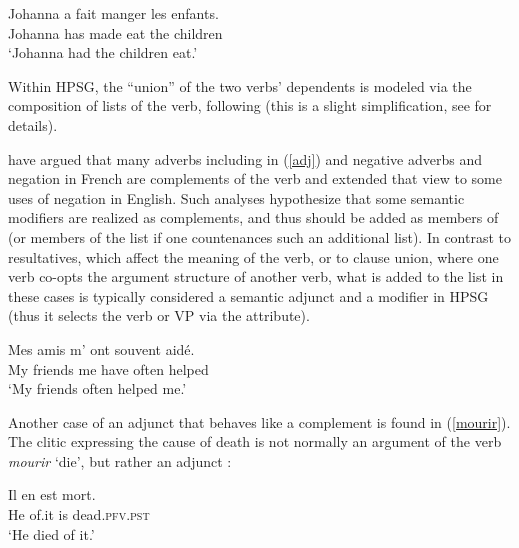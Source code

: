 \documentclass[output=paper
                ,modfonts
                ,nonflat
	        ,collection
	        ,collectionchapter
	        ,collectiontoclongg
 	        ,biblatex
                ,babelshorthands
                ,newtxmath
                ,draftmode
                ,colorlinks, citecolor=brown
]{./langsci/langscibook}
\begin{document}
\begin{exe}
\ex \label{faire}
\gll Johanna a fait manger les enfants. \\
Johanna has made eat the children \\
\glt `Johanna had the children eat.'
\end{exe}

\noindent
Within HPSG, the ``union'' of the two verbs' dependents is modeled via the composition of \argst lists of the  verb, following \citet{HinrichsandNakazawa1994} (this is a slight simplification, see   for details). 




\citet{AbeilleandGodard1997} have argued that many adverbs  including  in (\ref{adj}) and negative adverbs and negation in French are complements of the verb and \citet{KimandSag2002} extended that view to some uses of negation in English. Such analyses hypothesize that some semantic modifiers are realized as complements, and thus should be added as members of \argst (or members of the \deps list if one countenances such an additional list). In contrast to resultatives,  which affect the meaning of the verb, or to clause union, where one verb co-opts the argument structure of another verb, what is added to the \argst list in these cases is typically considered a semantic adjunct and a modifier in HPSG (thus it selects the verb or VP via the  attribute). 

\begin{exe}
\ex\label{adj}
 \gll
	Mes amis m’ ont souvent aidé. \\
	My friends me have often helped \\
	\glt `My friends often helped me.'
\end{exe}


Another case of an adjunct that behaves like a complement is found in (\ref{mourir}).  The clitic  expressing the cause of death   is not normally an argument of the verb \textit{mourir} `die', but rather an adjunct \citep{KoenigandDavis2006}: %

\begin{exe}
	\ex\label{mourir}
	\gll Il en est mort. \\
	 He of.it is dead.\textsc{pfv.pst} \\
	 \glt `He died of it.' \citep[ex.\ 12a]{KoenigandDavis2006}
\end{exe}
\end{document}
